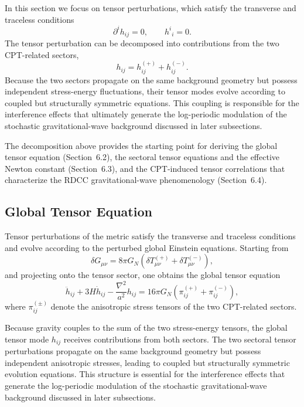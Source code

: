 \documentclass[11pt,a4paper]{article}
\begin{document}
In this section we focus on tensor perturbations, which satisfy the transverse
and traceless conditions
\begin{equation}
    \partial^{i} h_{ij} = 0,
    \qquad
    h^{i}{}_{i} = 0.
\end{equation}
The tensor perturbation can be decomposed into contributions from the two
CPT-related sectors,
\begin{equation}
    h_{ij}
    = h^{(+)}_{ij} + h^{(-)}_{ij}.
\end{equation}
Because the two sectors propagate on the same background geometry but possess
independent stress-energy fluctuations, their tensor modes evolve according to
coupled but structurally symmetric equations. This coupling is responsible for
the interference effects that ultimately generate the log-periodic modulation of
the stochastic gravitational-wave background discussed in later subsections.

The decomposition above provides the starting point for deriving the global
tensor equation (Section~6.2), the sectoral tensor equations and the effective
Newton constant (Section~6.3), and the CPT-induced tensor correlations that
characterize the RDCC gravitational-wave phenomenology (Section~6.4).

\subsection{Global Tensor Equation}

Tensor perturbations of the metric satisfy the transverse and traceless
conditions and evolve according to the perturbed global Einstein equations.
Starting from
\begin{equation}
    \delta G_{\mu\nu}
    = 8\pi G_{N}\left(
        \delta T^{(+)}_{\mu\nu}
        + \delta T^{(-)}_{\mu\nu}
    \right),
\end{equation}
and projecting onto the tensor sector, one obtains the global tensor equation
\begin{equation}
    \ddot{h}_{ij}
    + 3H\dot{h}_{ij}
    - \frac{\nabla^{2}}{a^{2}} h_{ij}
    = 16\pi G_{N}\left(
        \pi^{(+)}_{ij}
        + \pi^{(-)}_{ij}
    \right),
    \label{eq:globalTensor}
\end{equation}
where \(\pi^{(\pm)}_{ij}\) denote the anisotropic stress tensors of the two
CPT-related sectors.

Because gravity couples to the sum of the two stress-energy tensors, the global
tensor mode \(h_{ij}\) receives contributions from both sectors. The two
sectoral tensor perturbations propagate on the same background geometry but
possess independent anisotropic stresses, leading to coupled but structurally
symmetric evolution equations. This structure is essential for the interference
effects that generate the log-periodic modulation of the stochastic
gravitational-wave background discussed in later subsections.
\end{document}
